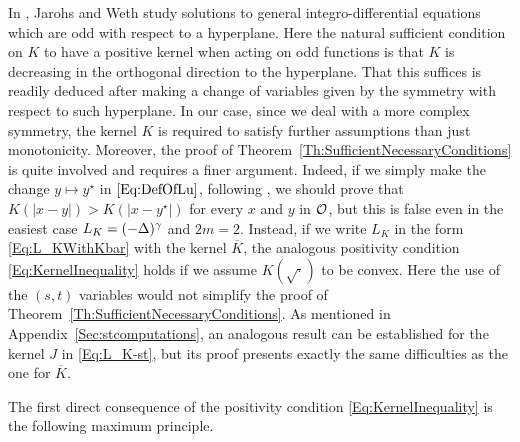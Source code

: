 In \cite{JarohsWeth}, Jarohs and Weth study solutions to general integro-differential equations which are odd with respect to a hyperplane. Here the natural sufficient condition on $K$ to have a positive kernel when acting on odd functions is that $K$ is decreasing in the orthogonal direction to the hyperplane. That this suffices is readily deduced after making a change of variables given by the symmetry with respect to such hyperplane. In our case, since we deal with a more complex symmetry, the kernel $K$ is required to satisfy further assumptions than just monotonicity. Moreover, the proof of Theorem~\ref{Th:SufficientNecessaryConditions} is quite involved and requires a finer argument. Indeed, if we simply make the change $y \mapsto y^\star$ in $\eqref{Eq:DefOfLu}$, following \cite{JarohsWeth}, we should prove that $K(|x-y|) > K(|x-y^\star|)$ for every $x$ and $y$ in $\mathcal{O}$, but this is false even in the easiest case $L_K = (-\Delta)^\gamma$ and $2m=2$. Instead, if we write $L_K$ in the form \eqref{Eq:L_KWithKbar} with the kernel $\overline{K}$, the analogous positivity condition \eqref{Eq:KernelInequality} holds if we assume $K(\sqrt{\cdot})$ to be convex. Here the use of the $(s,t)$ variables would not simplify the proof of Theorem~\ref{Th:SufficientNecessaryConditions}. As mentioned in Appendix~\ref{Sec:stcomputations}, an analogous result can be established for the kernel $J$ in \eqref{Eq:L_K-st}, but its proof presents exactly the same difficulties as the one for $\overline{K}$.


The first direct consequence of the positivity condition \eqref{Eq:KernelInequality} is the following maximum principle.

